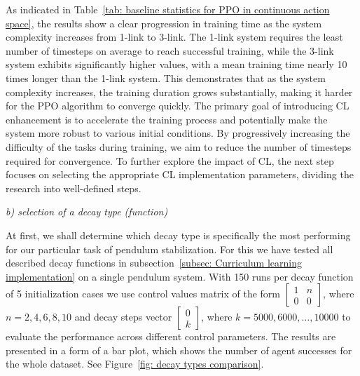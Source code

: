 As indicated in Table~\ref{tab: baseline statistics for PPO in continuous action space}, the results show a clear progression in training time as the system complexity increases from 1-link to 3-link. The 1-link system requires the least number of timesteps on average to reach successful training, while the 3-link system exhibits significantly higher values, with a mean training time nearly 10 times longer than the 1-link system. This demonstrates that as the system complexity increases, the training duration grows substantially, making it harder for the PPO algorithm to converge quickly.
The primary goal of introducing CL enhancement is to accelerate the training process and potentially make the system more robust to various initial conditions. By progressively increasing the difficulty of the tasks during training, we aim to reduce the number of timesteps required for convergence. To further explore the impact of CL, the next step focuses on selecting the appropriate CL implementation parameters, dividing the research into well-defined steps.

\textit{b) selection of a decay type (function)} 

At first, we shall determine which decay type is specifically the most performing for our particular task of pendulum stabilization. For this we have tested all described decay functions in subsection~\ref{subsec: Curriculum learning implementation} on a single pendulum system. With 150 runs per decay function of 5 initialization cases we use control values matrix of the form 
\(\begin{bmatrix} 1 & n \\ 0 & 0 \end{bmatrix}\), where \(n = 2, 4, 6, 8, 10\) and decay steps vector \(\begin{bmatrix} 0 \\ k \end{bmatrix}\), where \(k = 5000, 6000, \ldots, 10000\) to evaluate the performance across different control parameters. The results are presented in a form of a bar plot, which shows the number of agent successes for the whole dataset. See Figure~\ref{fig: decay types comparison}.  

